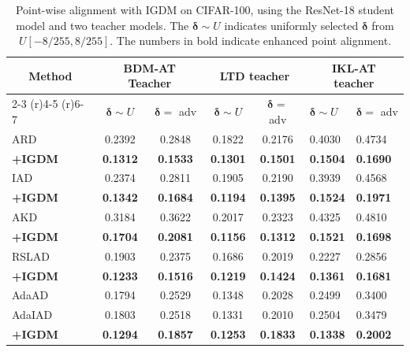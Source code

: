 \documentclass{article} %
\begin{document}
\begin{table}[h]
\caption{Point-wise alignment with IGDM on CIFAR-100, using the ResNet-18 student model and two teacher models. The $\boldsymbol{\delta} \sim U$ indicates uniformly selected $\boldsymbol{\delta}$ from $U[-8/255,8/255]$. 
The numbers in bold indicate enhanced point alignment.}
 \centering
 \setlength{\tabcolsep}{13pt}
 \begin{tabular}{lccccll}
 \toprule
     \multicolumn{1}{c}{\multirow{2.5}{*}{Method}}  &\multicolumn{2}{c}{BDM-AT Teacher}&\multicolumn{2}{c}{LTD teacher}&\multicolumn{2}{c}{IKL-AT teacher}\\

     \cmidrule(r){2-3} \cmidrule(r){4-5} \cmidrule(r){6-7}& $\boldsymbol{\delta} \sim U$ & $\boldsymbol{\delta} = $ adv   & $\boldsymbol{\delta} \sim U$ & $\boldsymbol{\delta} = $ adv  & $\boldsymbol{\delta} \sim U$ &$\boldsymbol{\delta} = $ adv  \\ 
\midrule
 ARD &0.2392 & 0.2848 & 0.1822 & 0.2176  & 0.4030 &0.4734\\
\textbf{+IGDM} &\textbf{0.1312} & \textbf{0.1533} & \textbf{0.1301} & \textbf{0.1501}  & \textbf{0.1504} &\textbf{0.1690} \\
 \midrule
 IAD &0.2374 &0.2811 & 0.1905 & 0.2190  & 0.3939 &0.4568 \\
\textbf{+IGDM}  &\textbf{0.1342} &\textbf{0.1684} & \textbf{0.1194} & \textbf{0.1395}  & \textbf{0.1524} &\textbf{0.1971} \\
 \midrule
 AKD& 0.3184 & 0.3622 &  0.2017 & 0.2323 & 0.4325 &0.4810 \\
 \textbf{+IGDM}  & \textbf{0.1704} & \textbf{0.2081} & \textbf{0.1156}  & \textbf{0.1312} & \textbf{0.1521}& \textbf{0.1698}\\
 \midrule
 RSLAD &0.1903 &0.2375 & 0.1686 & 0.2019  & 0.2227 &0.2856 \\
\textbf{+IGDM} &\textbf{0.1233} &\textbf{0.1516} & \textbf{0.1219} & \textbf{0.1424}  & \textbf{0.1361} &\textbf{0.1681} \\
  \midrule
 AdaAD &0.1794 &0.2529 & 0.1348 & 0.2028  & 0.2499 &0.3400 \\
  AdaIAD &0.1803 &0.2518 & 0.1331 & 0.2010  & 0.2504 &0.3479 \\
\textbf{+IGDM} &\textbf{0.1294} &\textbf{0.1857} & \textbf{0.1253} & \textbf{0.1833}  & \textbf{0.1338} &\textbf{0.2002} \\
 \bottomrule
 \end{tabular}
 \label{tab:ablation_dpoint}
\end{table}
\end{document}
